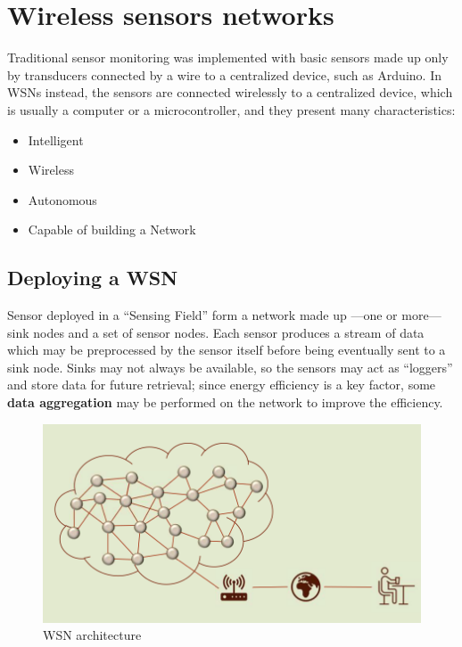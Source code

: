 \chapter{Wireless sensors networks}

Traditional sensor monitoring was implemented with basic sensors made up only by transducers connected by a wire to a centralized device, such as Arduino.
In WSNs instead, the sensors are connected wirelessly to a centralized device, which is usually a computer or a microcontroller, and they present many characteristics:
\begin{itemize}
   \item Intelligent
   \item Wireless
   \item Autonomous
   \item Capable of building a Network
\end{itemize}

\section{Deploying a WSN}

\begin{paracol}{2}
   

   Sensor deployed in a ``Sensing Field'' form a network made up ---one or more--- sink nodes and a set of sensor nodes.
   Each sensor produces a stream of data which may be preprocessed by the sensor itself before being eventually sent to a sink node.
   Sinks may not always be available, so the sensors may act as ``loggers'' and store data for future retrieval; since energy efficiency is a key factor, some \textbf{data aggregation} may be performed on the network to improve the efficiency.
   
   \switchcolumn
   \begin{figure}[htbp]
      \centering
      \includegraphics{images/wsn_arch.png}
      \caption{WSN architecture}
      \label{fig:wsn_arch}
   \end{figure}
\end{paracol}

